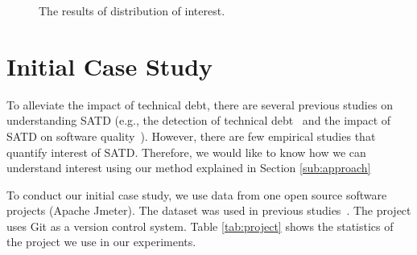 \begin{figure}[!t]
  \begin{center}

  \caption{The results of distribution of interest.}
  \label{fig:dist}
  \end{center}
\end{figure}


\section{Initial Case Study} \label{sec:results}
To alleviate the impact of technical debt, there are several previous studies on understanding SATD (e.g., the detection of technical debt~\cite{Potdar2014ICSME,Zazworka2013EASE} and the impact of SATD on software quality~\cite{Wehaibi2016SANER}).
However, there are few empirical studies that quantify interest of SATD.
Therefore, we would like to know how we can understand interest using our method explained in Section \ref{sub:approach}

To conduct our initial case study, we use data from one open source software projects (Apache Jmeter). The dataset was used in previous studies~\cite{Maldonado2015MTD,Potdar2014ICSME}. The project uses Git as a version control system. Table \ref{tab:project} shows the statistics of the project we use in our experiments. 

